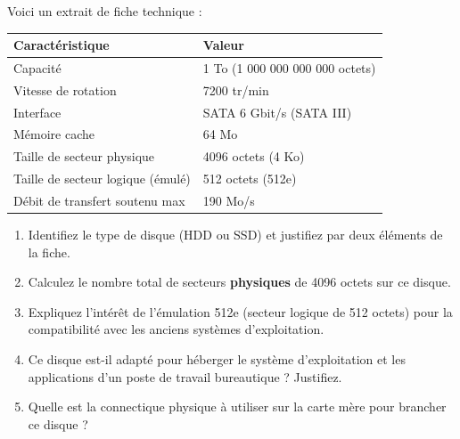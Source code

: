 \documentclass[11pt]{article}
\newcounter{popsec}
\newcounter{popsub}
\newcommand{\courssub}[1]{%
  \stepcounter{popsub}%
  \par\vspace{9pt}\noindent{\popxbold\fontsize{11.5}{13}\selectfont\color{popink}{\color{poporange}\thepopsec.\thepopsub}\hspace{6pt}#1}\par\nopagebreak\vspace{4pt}
}
\begin{document}
\courssub{Je m'entraîne}

\begin{exercice}
Voici un extrait de fiche technique :
\begin{center}
\begin{tabularx}{\linewidth}{|l|X|}
\hline
\rowcolor{popblueL}
\textbf{Caractéristique} & \textbf{Valeur} \\ \hline
Capacité & 1 To (1 000 000 000 000 octets) \\ \hline
Vitesse de rotation & 7200 tr/min \\ \hline
Interface & SATA 6 Gbit/s (SATA III) \\ \hline
Mémoire cache & 64 Mo \\ \hline
Taille de secteur physique & 4096 octets (4 Ko) \\ \hline
Taille de secteur logique (émulé) & 512 octets (512e) \\ \hline
Débit de transfert soutenu max & 190 Mo/s \\ \hline
\end{tabularx}
\end{center}
\begin{enumerate}
    \item Identifiez le type de disque (HDD ou SSD) et justifiez par deux éléments de la fiche.
    \item Calculez le nombre total de secteurs \textbf{physiques} de 4096 octets sur ce disque.
    \item Expliquez l'intérêt de l'émulation 512e (secteur logique de 512 octets) pour la compatibilité avec les anciens systèmes d'exploitation.
    \item Ce disque est-il adapté pour héberger le système d'exploitation et les applications d'un poste de travail bureautique ? Justifiez.
    \item Quelle est la connectique physique à utiliser sur la carte mère pour brancher ce disque ?
\end{enumerate}
\end{exercice}
\end{document}
